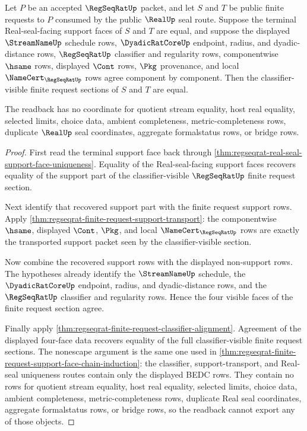 \begin{theorem}
\label{thm:regseqrat-real-seal-support-face-classifier-readback}
Let $P$ be an accepted $\RegSeqRatUp$ packet, and let $S$ and $T$ be public
finite requests to $P$ consumed by the public $\RealUp$ seal route. Suppose
the terminal Real-seal-facing support faces of $S$ and $T$ are equal, and
suppose the displayed $\StreamNameUp$ schedule rows, $\DyadicRatCoreUp$
endpoint, radius, and dyadic-distance rows, $\RegSeqRatUp$ classifier and
regularity rows, componentwise $\hsame$ rows, displayed $\Cont$ rows, $\Pkg$
provenance, and local $\NameCert_{\RegSeqRatUp}$ rows agree component by
component. Then the classifier-visible finite request sections of $S$ and
$T$ are equal.

The readback has no coordinate for quotient stream equality, host real
equality, selected limits, choice data, ambient completeness,
metric-completeness rows, duplicate $\RealUp$ seal coordinates, aggregate
formalstatus rows, or bridge rows.
\end{theorem}
\begin{proof}
First read the terminal support face back through
\autoref{thm:regseqrat-real-seal-support-face-uniqueness}. Equality of the
Real-seal-facing support faces recovers equality of the support part of the
classifier-visible $\RegSeqRatUp$ finite request section.

Next identify that recovered support part with the finite request support
rows. Apply
\autoref{thm:regseqrat-finite-request-support-transport}: the componentwise
$\hsame$, displayed $\Cont$, $\Pkg$, and local
$\NameCert_{\RegSeqRatUp}$ rows are exactly the transported support packet
seen by the classifier-visible section.

Now combine the recovered support rows with the displayed non-support rows.
The hypotheses already identify the $\StreamNameUp$ schedule, the
$\DyadicRatCoreUp$ endpoint, radius, and dyadic-distance rows, and the
$\RegSeqRatUp$ classifier and regularity rows. Hence the four visible faces
of the finite request section agree.

Finally apply
\autoref{thm:regseqrat-finite-request-classifier-alignment}. Agreement of
the displayed four-face data recovers equality of the full classifier-visible
finite request sections. The nonescape argument is the same one used in
\autoref{thm:regseqrat-finite-request-support-face-chain-induction}: the
classifier, support-transport, and Real-seal uniqueness routes contain only
the displayed BEDC rows. They contain no rows for quotient stream equality,
host real equality, selected limits, choice data, ambient completeness,
metric-completeness rows, duplicate Real seal coordinates, aggregate
formalstatus rows, or bridge rows, so the readback cannot export any of those
objects.
\end{proof}
